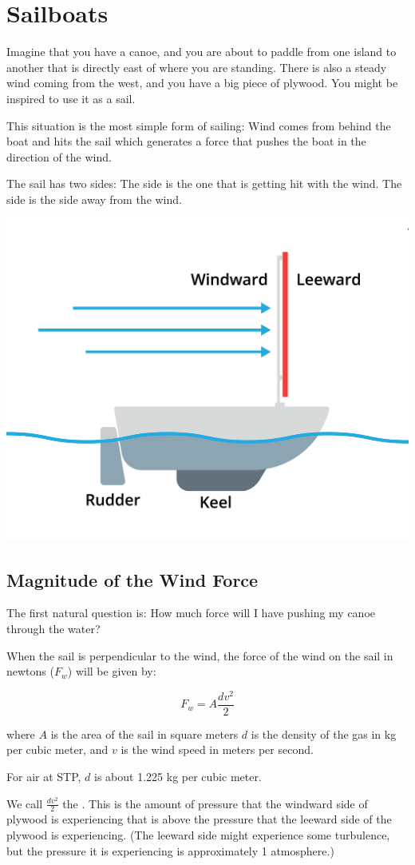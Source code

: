 \chapter{Sailboats}

Imagine that you have a canoe, and you are about to paddle from one island to another that is directly east of where you are standing. There 
is also a steady wind coming from the west, and you have a big piece of plywood.  You might be inspired to use it as a sail.

This situation is the most simple form of sailing: Wind comes from behind the boat and hits the sail which generates a force that pushes the 
boat in the direction of the wind.

The sail has two sides:  The  side is the one that is getting hit with the wind. The  side is the side away from the wind.

\includegraphics[width=.75\textwidth]{plywood.png}


\section{Magnitude of the Wind Force}

The first natural question is: How much force will I have pushing my canoe through the water?

\begin{mdframed}[style=important, frametitle={Wind Force}]

When the sail is perpendicular to the wind,  the force of the wind on the sail in newtons ($F_w$) will be given by:

$$F_w = A \frac{d v^2}{2}$$

where $A$ is the area of the sail in square meters  $d$ is the density of the gas in kg per cubic meter, and $v$ is the wind speed in meters per second.

For air at STP,  $d$ is about 1.225 kg per cubic meter.

We call $\frac{d v^2}{2}$  the .  This is the amount of pressure that the windward side of plywood is experiencing that is above the 
 pressure that the leeward side of the plywood is experiencing.  (The leeward side might experience some turbulence,  but the pressure it is experiencing is 
 approximately 1 atmosphere.)

\end{mdframed}

